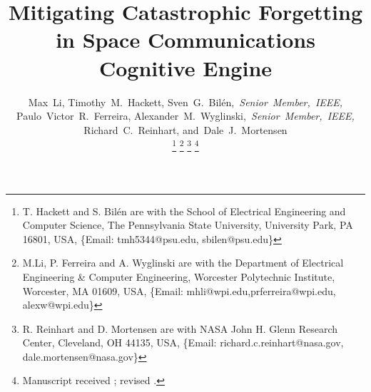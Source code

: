 \documentclass[journal]{IEEEtran}
\begin{document}
%
\title{Mitigating Catastrophic Forgetting in Space Communications Cognitive Engine}
%
%
%

\author{Max~Li,
		Timothy~M.~Hackett,
        Sven~G.~Bil\'{e}n,\textit{~Senior~Member,~IEEE,}
        Paulo~Victor~R.~Ferreira,
        Alexander~M.~Wyglinski,\textit{~Senior~Member,~IEEE,}
        Richard~C.~Reinhart,
        and~Dale~J.~Mortensen%
        
\thanks{T. Hackett and S. Bil\'{e}n are with the School
of Electrical Engineering and Computer Science, The Pennsylvania State University, University Park, PA 16801, USA, \{Email: tmh5344@psu.edu, sbilen@psu.edu\}}%
\thanks{M.Li, P. Ferreira and A. Wyglinski are with the Department of Electrical Engineering \& Computer Engineering, Worcester Polytechnic Institute, Worcester, MA 01609, USA, \{Email: mhli@wpi.edu,prferreira@wpi.edu, alexw@wpi.edu\}}%
\thanks{R. Reinhart and D. Mortensen are with NASA John H. Glenn Research Center, Cleveland, OH 44135, USA, \{Email: richard.c.reinhart@nasa.gov, dale.mortensen@nasa.gov\}}%
\thanks{Manuscript received ; revised .}}

% 
%
\end{document}
